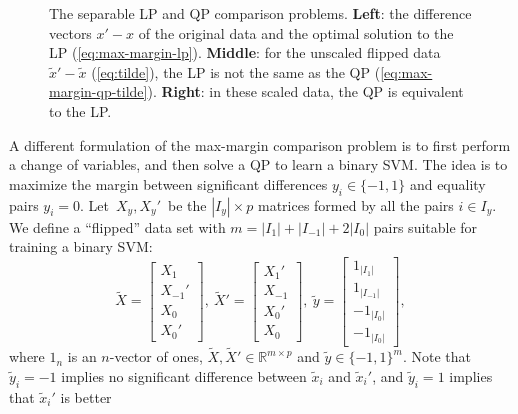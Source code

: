 \documentclass{article}
\newcommand{\RR}{\mathbb R}
\begin{document}
\begin{figure*}[b!]
  \hskip -1.5cm
  \begin{small}
      
  \end{small}
  \vskip -0.9cm
  \caption{The separable LP and QP comparison problems. \textbf{Left}:
    the difference vectors $x'-x$ of the original data and the optimal
    solution to the LP (\ref{eq:max-margin-lp}). \textbf{Middle}: for
    the unscaled flipped data $\tilde x'-\tilde x$ (\ref{eq:tilde}),
    the LP is not the same as the QP
    (\ref{eq:max-margin-qp-tilde}). \textbf{Right}: in these scaled
    data, the QP is equivalent to the LP.}
  \label{fig:hard-margin}
\end{figure*}

A different formulation of the max-margin comparison problem is to
first perform a change of variables, and then solve a QP to learn a
binary SVM. The idea is to maximize the margin between significant
differences $y_i\in\{-1,1\}$ and equality pairs
$y_i=0$. Let~$X_y,X_y'$~be the $|I_y|\times p$ matrices formed by all
the pairs $i\in I_y$. We define a ``flipped'' data set with
$m=|I_1|+|I_{-1}|+2|I_0|$ pairs suitable for training a binary SVM:
\begin{equation}
\label{eq:tilde}
  \tilde X = \left[
    \begin{array}{c}
      X_1 \\
      X_{-1}'\\
      X_0\\
      X_0'
    \end{array}
  \right],\ 
  \tilde X' = \left[
    \begin{array}{c}
      X_1' \\
      X_{-1}\\
      X_0'\\
      X_0
    \end{array}
  \right],\ 
  \tilde y = \left[
    \begin{array}{c}
      1_{|I_1|} \\
      1_{|I_{-1}|}\\
      -1_{|I_0|}\\
      -1_{|I_0|}
    \end{array}
  \right],
\end{equation}
where $1_n$ is an $n$-vector of ones, $\tilde X,\tilde
X'\in\RR^{m\times p}$ and $\tilde y\in\{-1,1\}^m$. Note that $\tilde
y_i=-1$ implies no significant difference between $\tilde x_i$ and
$\tilde x_i'$, and $\tilde y_i=1$ implies that $\tilde x_i'$ is better
\end{document}
